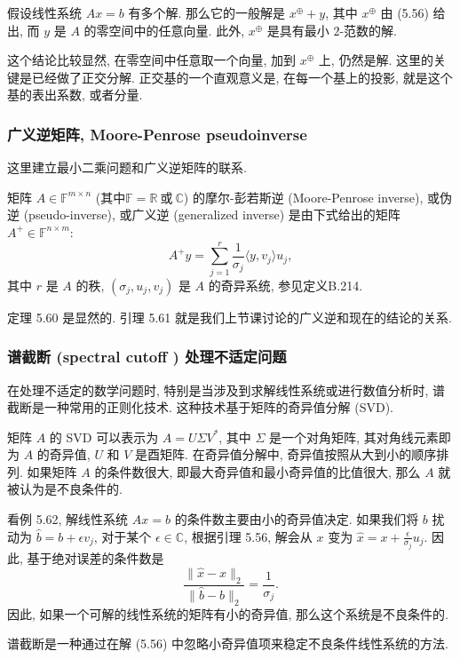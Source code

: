 \documentclass[a4paper]{ctexart}
\newcommand{\hl}[1]
{\noindent {\bf {#1}}}
\begin{document}
\hl{定理5.58} 
假设线性系统 $Ax = b$ 有多个解. 那么它的一般解是 $x^{\oplus} + y$, 
其中 $x^{\oplus}$ 由 (5.56) 给出, 而 $y$ 是 $A$ 的零空间中的任意向量. 此外, $x^{\oplus}$ 是具有最小 $2$-范数的解.

这个结论比较显然, 在零空间中任意取一个向量, 加到 $x^{\oplus}$ 上, 仍然是解. 这里的关键是已经做了正交分解. 
正交基的一个直观意义是, 在每一个基上的投影, 就是这个基的表出系数, 或者分量. 

\subsubsection{广义逆矩阵, Moore-Penrose pseudoinverse}

这里建立最小二乘问题和广义逆矩阵的联系. 

\hl{定义5.59} 矩阵 $A \in \mathbb{F}^{m \times n}$ 
(其中$\mathbb{F} = \mathbb{R}~\mbox{或}~\mathbb{C}$) 的摩尔-彭若斯逆 (Moore-Penrose inverse),
或伪逆 (pseudo-inverse), 或广义逆 (generalized inverse) 是由下式给出的矩阵
$A^+ \in \mathbb{F}^{n \times m}$:
\[ 
A^+ y = \sum_{j=1}^{r} \frac{1}{\sigma_j} \langle y, v_j \rangle u_j, 
\]
其中 $r$ 是 $A$ 的秩, $(\sigma_j, u_j, v_j)$ 是 $A$ 的奇异系统, 参见定义B.214. 

定理 5.60 是显然的. 引理 5.61 就是我们上节课讨论的广义逆和现在的结论的关系. 

\subsubsection{谱截断 (spectral cutoff ) 处理不适定问题}

在处理不适定的数学问题时, 特别是当涉及到求解线性系统或进行数值分析时, 
谱截断是一种常用的正则化技术. 这种技术基于矩阵的奇异值分解 (SVD).

矩阵 $A$ 的 SVD 可以表示为 $A = U\Sigma V^*$, 其中 $\Sigma$ 是一个对角矩阵, 
其对角线元素即为 $A$ 的奇异值, $U$ 和 $V$ 是酉矩阵. 在奇异值分解中, 
奇异值按照从大到小的顺序排列. 如果矩阵 $A$ 的条件数很大, 即最大奇异值和最小奇异值的比值很大, 
那么 $A$ 就被认为是不良条件的.

看例 5.62, 解线性系统 $Ax = b$ 的条件数主要由小的奇异值决定. 
如果我们将 $b$ 扰动为 $\hat{b} = b + \epsilon v_j$, 对于某个 
$\epsilon \in \mathbb{C}$, 根据引理 5.56, 解会从 $x$ 变为 
$\hat{x} = x + \frac{\epsilon}{\sigma_j} u_j$. 
因此, 基于绝对误差的条件数是
\[ 
\frac{\|\hat{x} - x\|_2}{\|\hat{b} - b\|_2} = \frac{1}{\sigma_j}. 
\]
因此, 如果一个可解的线性系统的矩阵有小的奇异值, 那么这个系统是不良条件的. 

\hl{定义5.63} 谱截断是一种通过在解 (5.56) 中忽略小奇异值项来稳定不良条件线性系统的方法. 
\end{document}
